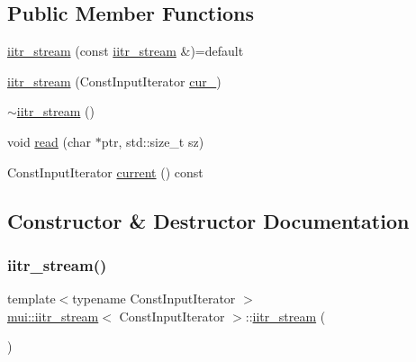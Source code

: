 \subsection*{Public Member Functions}
\begin{DoxyCompactItemize}
\item 
\hyperlink{classmui_1_1iitr__stream_a63616e1aa49e6c9393041ad41ee46459}{iitr\+\_\+stream} (const \hyperlink{classmui_1_1iitr__stream}{iitr\+\_\+stream} \&)=default
\item 
\hyperlink{classmui_1_1iitr__stream_a8989d81db9c1bf9736d7e00ca14dc80d}{iitr\+\_\+stream} (Const\+Input\+Iterator \hyperlink{bin_8h_adaedeb4494f60b41fe2e306a04764402}{cur\+\_\+})
\item 
\hyperlink{classmui_1_1iitr__stream_a129cf88483da2a1fc727aae04cb317d9}{$\sim$iitr\+\_\+stream} ()
\item 
void \hyperlink{classmui_1_1iitr__stream_aa39fd880d0a4ec821775a86c0d7bc2ce}{read} (char $\ast$ptr, std\+::size\+\_\+t sz)
\item 
Const\+Input\+Iterator \hyperlink{classmui_1_1iitr__stream_ab4f7f7a6e33eeb69b38d83b048dc9875}{current} () const
\end{DoxyCompactItemize}


\subsection{Constructor \& Destructor Documentation}
\mbox{\label{classmui_1_1iitr__stream_a63616e1aa49e6c9393041ad41ee46459}} 
\subsubsection{\texorpdfstring{iitr\+\_\+stream()}{iitr\_stream()}\hspace{0.1cm}{\footnotesize\ttfamily [1/2]}}
{\footnotesize\ttfamily template$<$typename Const\+Input\+Iterator $>$ \\
\hyperlink{classmui_1_1iitr__stream}{mui\+::iitr\+\_\+stream}$<$ Const\+Input\+Iterator $>$\+::\hyperlink{classmui_1_1iitr__stream}{iitr\+\_\+stream} (\begin{DoxyParamCaption}\item[{const \hyperlink{classmui_1_1iitr__stream}{iitr\+\_\+stream}$<$ Const\+Input\+Iterator $>$ \&}]{ }\end{DoxyParamCaption})\hspace{0.3cm}{\ttfamily [default]}}

